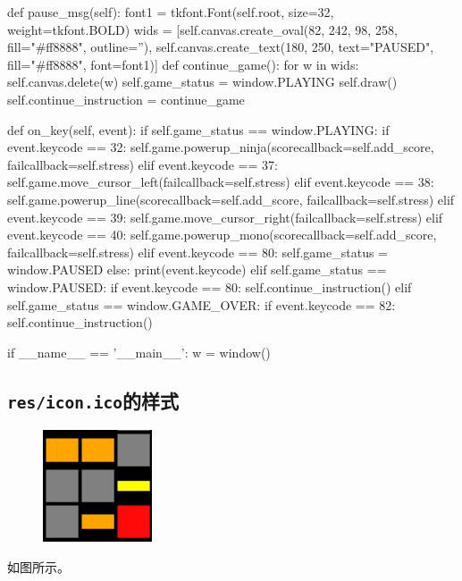 \documentclass[UTF8]{article}
\begin{document}
\begin{python}
    def pause_msg(self):
        font1 = tkfont.Font(self.root, size=32, weight=tkfont.BOLD)
        wids = [self.canvas.create_oval(82, 242, 98, 258, fill="#ff8888", outline=''),
                self.canvas.create_text(180, 250, text="PAUSED", fill="#ff8888", font=font1)]
        def continue_game():
            for w in wids:
                self.canvas.delete(w)
            self.game_status = window.PLAYING
            self.draw()
        self.continue_instruction = continue_game
    
    def on_key(self, event):
        if self.game_status == window.PLAYING:
            if event.keycode == 32:
                self.game.powerup_ninja(scorecallback=self.add_score, failcallback=self.stress)
            elif event.keycode == 37:
                self.game.move_cursor_left(failcallback=self.stress)
            elif event.keycode == 38:
                self.game.powerup_line(scorecallback=self.add_score, failcallback=self.stress)
            elif event.keycode == 39:
                self.game.move_cursor_right(failcallback=self.stress)
            elif event.keycode == 40:
                self.game.powerup_mono(scorecallback=self.add_score, failcallback=self.stress)
            elif event.keycode == 80:
                self.game_status = window.PAUSED
            else:
                print(event.keycode)
        elif self.game_status == window.PAUSED:
            if event.keycode == 80:
                self.continue_instruction()
        elif self.game_status == window.GAME_OVER:
            if event.keycode == 82:
                self.continue_instruction()

if __name__ == '__main__':
    w = window()

\end{python}

\subsection{\texttt{res/icon.ico}的样式}
\begin{figure}[H]
\centering
\includegraphics[scale=0.20]{icon.png}
\end{figure}
如图所示。
\end{document}
